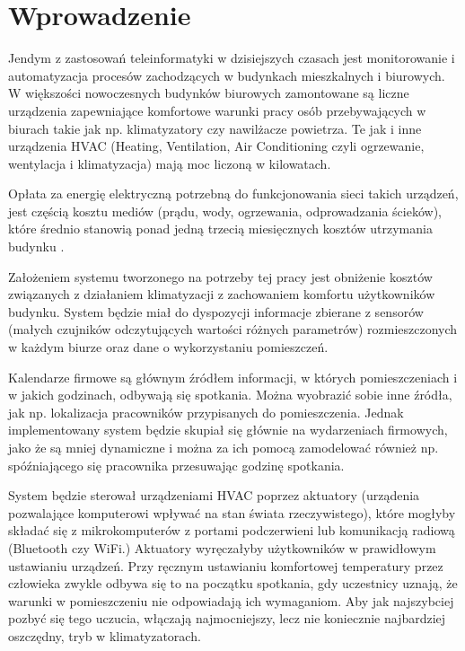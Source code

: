\chapter{Wprowadzenie}
Jendym z zastosowań teleinformatyki w dzisiejszych czasach jest monitorowanie i automatyzacja procesów zachodzących w budynkach mieszkalnych i biurowych. 
W większości nowoczesnych budynków biurowych zamontowane są liczne urządzenia zapewniające komfortowe warunki pracy osób przebywających w biurach takie jak np. klimatyzatory czy nawilżacze powietrza. Te jak i inne urządzenia HVAC (Heating, Ventilation, Air Conditioning czyli ogrzewanie, wentylacja i klimatyzacja) mają moc liczoną w kilowatach.

Opłata za energię elektryczną potrzebną do funkcjonowania sieci takich urządzeń, jest częścią kosztu mediów (prądu, wody, ogrzewania, odprowadzania ścieków), które średnio stanowią ponad jedną trzecią miesięcznych kosztów utrzymania budynku \cite{bib:raportKoszty}.

Założeniem systemu tworzonego na potrzeby tej pracy jest obniżenie kosztów związanych z działaniem klimatyzacji z zachowaniem komfortu użytkowników budynku. 
System będzie miał do dyspozycji informacje zbierane z sensorów (małych czujników odczytujących wartości różnych parametrów) rozmieszczonych w każdym biurze oraz dane o wykorzystaniu pomieszczeń. 



Kalendarze firmowe są głównym źródłem informacji, w których pomieszczeniach i w jakich godzinach, odbywają się spotkania. Można wyobrazić sobie inne źródła, jak np. lokalizacja pracowników przypisanych do pomieszczenia. 
Jednak implementowany system będzie skupiał się głównie na wydarzeniach firmowych, jako że są mniej dynamiczne i można za ich pomocą zamodelować również np. spóźniającego się pracownika przesuwając godzinę spotkania.

System będzie sterował urządzeniami HVAC poprzez aktuatory (urządenia pozwalające komputerowi wpływać na stan świata rzeczywistego), które mogłyby składać się z mikrokomputerów z portami podczerwieni lub komunikacją radiową (Bluetooth czy WiFi.)
Aktuatory wyręczałyby użytkowników w prawidłowym ustawianiu urządzeń.
Przy ręcznym ustawianiu komfortowej temperatury przez człowieka zwykle odbywa się to na początku spotkania, gdy uczestnicy uznają, że warunki w pomieszczeniu nie odpowiadają ich wymaganiom. 
Aby jak najszybciej pozbyć się tego uczucia, włączają najmocniejszy, lecz nie koniecznie najbardziej oszczędny, tryb w klimatyzatorach.

